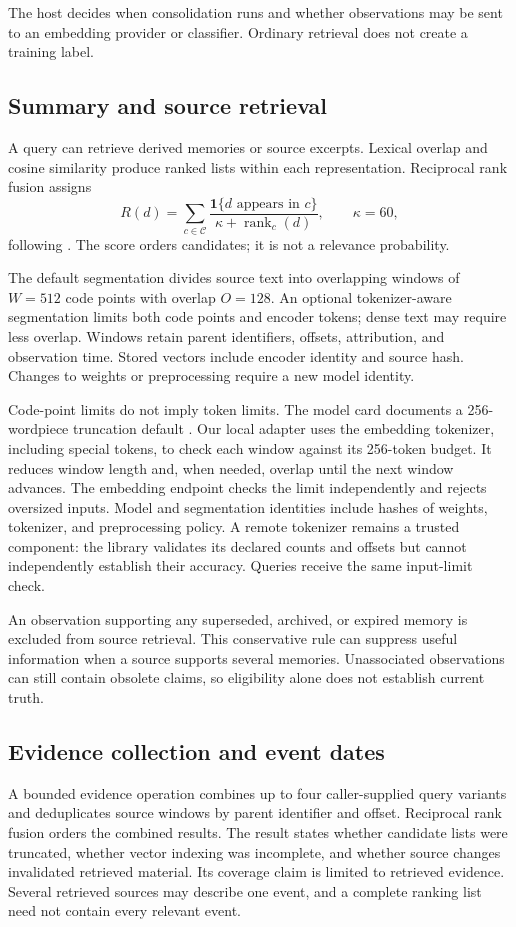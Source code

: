 \documentclass[11pt]{article}
\newcommand{\ind}{\mathbf{1}}
\begin{document}
The host decides when consolidation runs and whether observations may be sent to an embedding provider or classifier. Ordinary retrieval does not create a training label.

\subsection{Summary and source retrieval}
A query can retrieve derived memories or source excerpts. Lexical overlap and cosine similarity produce ranked lists within each representation. Reciprocal rank fusion assigns
\[
 R(d)=\sum_{c\in\mathcal{C}}
 \frac{\ind\{d\text{ appears in }c\}}{\kappa+\operatorname{rank}_c(d)},
 \qquad \kappa=60,
\]
following \citet{rrf}. The score orders candidates; it is not a relevance probability.

The default segmentation divides source text into overlapping windows of $W=512$ code points with overlap $O=128$. An optional tokenizer-aware segmentation limits both code points and encoder tokens; dense text may require less overlap. Windows retain parent identifiers, offsets, attribution, and observation time. Stored vectors include encoder identity and source hash. Changes to weights or preprocessing require a new model identity.

Code-point limits do not imply token limits. The model card documents a 256-wordpiece truncation default \citep{minilmcard}. Our local adapter uses the embedding tokenizer, including special tokens, to check each window against its 256-token budget. It reduces window length and, when needed, overlap until the next window advances. The embedding endpoint checks the limit independently and rejects oversized inputs. Model and segmentation identities include hashes of weights, tokenizer, and preprocessing policy. A remote tokenizer remains a trusted component: the library validates its declared counts and offsets but cannot independently establish their accuracy. Queries receive the same input-limit check.

An observation supporting any superseded, archived, or expired memory is excluded from source retrieval. This conservative rule can suppress useful information when a source supports several memories. Unassociated observations can still contain obsolete claims, so eligibility alone does not establish current truth.


\subsection{Evidence collection and event dates}
A bounded evidence operation combines up to four caller-supplied query variants and deduplicates source windows by parent identifier and offset. Reciprocal rank fusion orders the combined results. The result states whether candidate lists were truncated, whether vector indexing was incomplete, and whether source changes invalidated retrieved material. Its coverage claim is limited to retrieved evidence. Several retrieved sources may describe one event, and a complete ranking list need not contain every relevant event.
\end{document}
